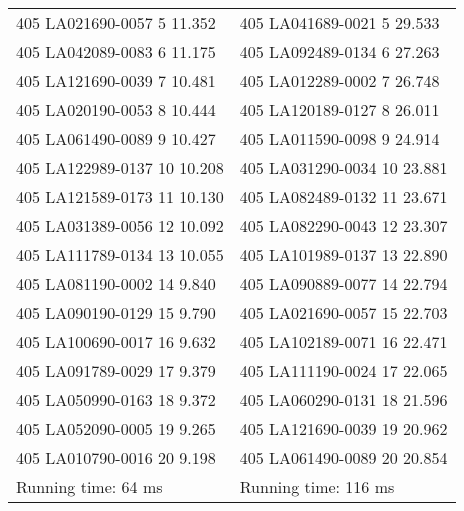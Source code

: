 \begin{tabular}{ l l }
405 LA021690-0057 5 11.352 & 405 LA041689-0021 5 29.533\\
405 LA042089-0083 6 11.175 & 405 LA092489-0134 6 27.263\\
405 LA121690-0039 7 10.481 & 405 LA012289-0002 7 26.748\\
405 LA020190-0053 8 10.444 & 405 LA120189-0127 8 26.011\\
405 LA061490-0089 9 10.427 & 405 LA011590-0098 9 24.914\\
405 LA122989-0137 10 10.208 & 405 LA031290-0034 10 23.881\\
405 LA121589-0173 11 10.130 & 405 LA082489-0132 11 23.671\\
405 LA031389-0056 12 10.092 & 405 LA082290-0043 12 23.307\\
405 LA111789-0134 13 10.055 & 405 LA101989-0137 13 22.890\\
405 LA081190-0002 14 9.840 & 405 LA090889-0077 14 22.794\\
405 LA090190-0129 15 9.790 & 405 LA021690-0057 15 22.703\\
405 LA100690-0017 16 9.632 & 405 LA102189-0071 16 22.471\\
405 LA091789-0029 17 9.379 & 405 LA111190-0024 17 22.065\\
405 LA050990-0163 18 9.372 & 405 LA060290-0131 18 21.596\\
405 LA052090-0005 19 9.265 & 405 LA121690-0039 19 20.962\\
405 LA010790-0016 20 9.198 & 405 LA061490-0089 20 20.854\\
Running time: 64 ms & Running time: 116 ms
\end{tabular}
\newpage
